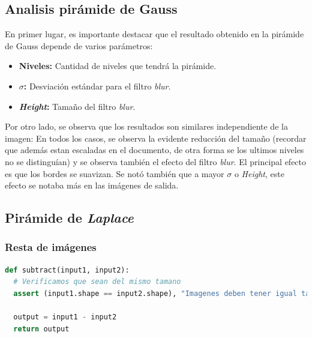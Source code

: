 \documentclass[12pt, letterpaper]{article}
\begin{document}
\subsection{Analisis pirámide de Gauss}
En primer lugar, es importante destacar que el resultado obtenido en la pirámide de Gauss depende de varios parámetros: 

\begin{itemize}
  \item \textbf{Niveles:} Cantidad de niveles que tendrá la pirámide. 
  \item \textbf{$\sigma$:} Desviación estándar para el filtro \textit{blur}.
  \item \textbf{\textit{Height}:} Tamaño del filtro \textit{blur}.
\end{itemize}

Por otro lado, se observa que los resultados son similares independiente de la imagen: En todos los casos, se observa la evidente reducción del tamaño (recordar que además estan escaladas en el documento, de otra forma se los ultimos niveles no se distinguían) y se observa también el efecto del filtro \textit{blur}. El principal efecto es que los bordes se suavizan. Se notó también que a mayor $\sigma$ o \textit{Height}, este efecto se notaba más en las imágenes de salida. 




\newpage
\subsection{Pirámide de \textit{Laplace}}
\subsubsection{Resta de imágenes}

\begin{lstlisting}[language=Python, label = subCode, caption=Implementación resta de imágenes.]
def subtract(input1, input2):
  # Verificamos que sean del mismo tamano
  assert (input1.shape == input2.shape), "Imagenes deben tener igual tamano"
  
  output = input1 - input2
  return output
\end{lstlisting}
\end{document}
